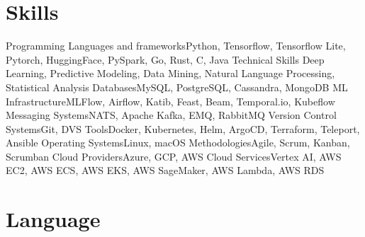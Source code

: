 \section{Skills}

\cvline%
{Programming Languages and frameworks}{Python, Tensorflow, Tensorflow Lite, Pytorch, HuggingFace, PySpark, Go, Rust, C, Java}
\cvline%
{Technical Skills} {Deep Learning, Predictive Modeling, Data Mining, Natural Language Processing, Statistical Analysis}
\cvline%
{Databases}{MySQL, PostgreSQL, Cassandra, MongoDB}
\cvline%
{ML Infrastructure}{MLFlow, Airflow, Katib, Feast, Beam, Temporal.io, Kubeflow}
\cvline%
{Messaging Systems}{NATS, Apache Kafka, EMQ, RabbitMQ}
\cvline%
{Version Control Systems}{Git, DVS}
\cvline%
{Tools}{Docker, Kubernetes, Helm, ArgoCD, Terraform, Teleport, Ansible}
\cvline%
{Operating Systems}{Linux, macOS}
\cvline%
{Methodologies}{Agile, Scrum, Kanban, Scrumban}
\cvline%
{Cloud Providers}{Azure, GCP, AWS}
\cvline%
{Cloud Services}{Vertex AI, AWS EC2, AWS ECS, AWS EKS, AWS SageMaker, AWS Lambda, AWS RDS}

\section{Language}


\emptysection{}\closesection{}
